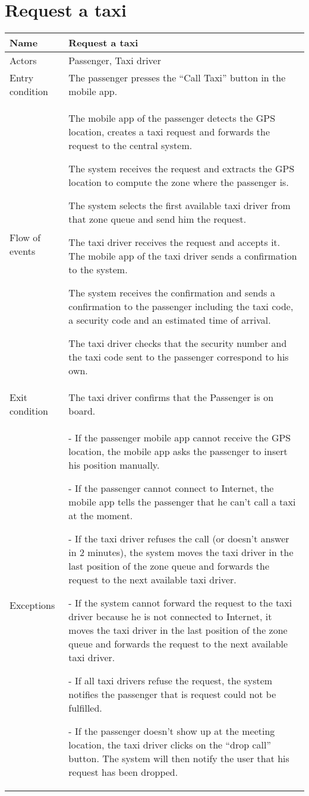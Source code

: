 \section{Request a taxi}
\begin{center}
\begin{longtable}{|l| p{9cm}|}
\hline
Name &
Request a taxi \\
\hline
Actors &
Passenger, Taxi driver \\
\hline
Entry condition & 
The passenger presses the “Call Taxi” button in the mobile app. \\
\hline
Flow of events &
The mobile app of the passenger detects the GPS location, creates a taxi request and forwards the request to the central system.

The system receives the request and extracts the GPS location to compute the zone where the passenger is.

The system selects the first available taxi driver from that zone queue and send him the request.

The taxi driver receives the request and accepts it. The mobile app of the taxi driver sends a confirmation to the system.

The system receives the confirmation and sends a confirmation to the passenger including the taxi code, a security code and an estimated time of arrival.

The taxi driver checks that the security number and the taxi code sent to the passenger correspond to his own. \\
\hline
Exit condition &
The taxi driver confirms that the Passenger is on board. \\
\hline
Exceptions &
- If the passenger mobile app cannot receive the GPS location, the mobile app asks the passenger to insert his position manually.

- If the passenger cannot connect to Internet, the mobile app tells the passenger that he can't call a taxi at the moment.

- If the taxi driver refuses the call (or doesn't answer in 2 minutes), the system moves the taxi driver in the last position of the zone queue and forwards the request to the next available taxi driver.

- If the system cannot forward the request to the taxi driver because he is not connected to Internet, it moves the taxi driver in the last position of the zone queue and forwards the request to the next available taxi driver.

- If all taxi drivers refuse the request, the system notifies the passenger that is request could not be fulfilled.

- If the passenger doesn't show up at the meeting location, the taxi driver clicks on the “drop call” button. The system will then notify the user that his request has been dropped. \\
\hline
\end{longtable}
\end{center}


